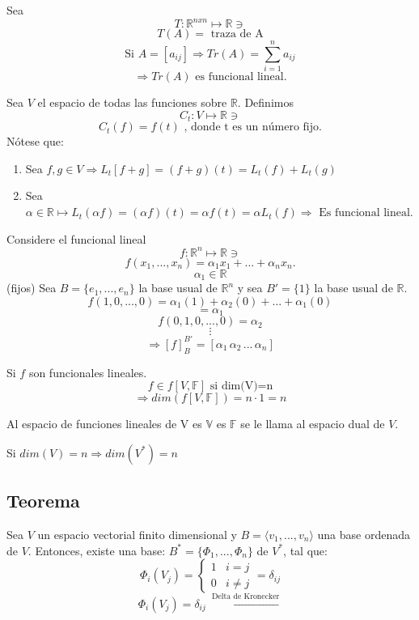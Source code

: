 \documentclass[11pt,fleqn]{book} %
\begin{document}
\begin{exercise}
Sea $$T:\mathbb{R}^{nxn}\mapsto\mathbb{R}\ni$$
$$T(A)=\text{ traza de A}$$
$$\text{Si } A=[a_{ij}]\Rightarrow Tr(A) = \sum^n_{i=1}a_{ij}$$
$$\Rightarrow Tr(A) \text{ es funcional lineal.}$$
\end{exercise}
\begin{exercise}
Sea $V$ el espacio de todas las funciones sobre $\mathbb{R}$.
Definimos $$C_t: V\mapsto\mathbb{R}\ni$$
$$C_t(f)=f(t)\text{ , donde t es un número fijo.}$$
Nótese que:
\begin{enumerate}
    \item Sea $f,g\in V\Rightarrow L_t[f+g]=(f+g)(t)=L_t(f)+L_t(g)$
    \item Sea $\alpha\in\mathbb{R}\mapsto L_t(\alpha f)=(\alpha f)(t)=\alpha f(t)=\alpha L_t(f)\Rightarrow\text{ Es funcional lineal.}$
\end{enumerate}
\end{exercise}

\begin{notation}
Considere el funcional lineal $$f:\mathbb{R}^n\mapsto\mathbb{R}\ni$$$$f(x_1,...,x_n)=\alpha_1 x_1+...+\alpha_n x_n.$$
$$ \alpha_1\in\mathbb{R}$$ (fijos)
Sea $B=\{e_1,...,e_n\}$ la base usual de $\mathbb{R}^n$ y sea $B'=\{1\}$ la base usual de $\mathbb{R}$. $$f(1,0,...,0)=\alpha_1(1)+\alpha_2(0)+...+\alpha_1(0)$$
$$=\alpha_1$$
$$f(0,1,0,...,0)=\alpha_2$$
$$\vdots$$
$$\Rightarrow[f]^{B'}_B =[\alpha_1\,\alpha_2\,...\,\alpha_n]$$

\end{notation}

\begin{notation}
Si $f$ son funcionales lineales. 
$$f\in f[V,\mathbb{F}]\text{ si dim(V)=n}$$
$$\Rightarrow dim( f[V,\mathbb{F}])= n\cdot1=n$$
\end{notation}

\begin{definition}[$V^{*}$]
Al espacio de funciones lineales de V es $\mathbb{V}$ es $\mathbb{F}$ se le llama al espacio dual de $V$.
\end{definition}

\begin{notation}
Si $dim(V)=n \Rightarrow dim(V^*)=n$
\end{notation}

\subsection{Teorema}
\begin{theorem}
Sea $V$ un espacio vectorial finito dimensional y $B=\langle v_1,...,v_n\rangle$ una base ordenada de $V$. Entonces, existe una base: $B^* = \{\Phi_1,...,\Phi_n\}$ de $V^*$, tal que: 
$$\Phi_i(V_j)=
    \begin{cases} 
      1 & i=j \\
      0 & i\neq j  
   \end{cases} = \delta_{ij} $$
$$\Phi_i(V_j)=\delta_{ij}\xleftarrow{\text{ Delta de Kronecker}}$$


\end{theorem}
\end{document}
